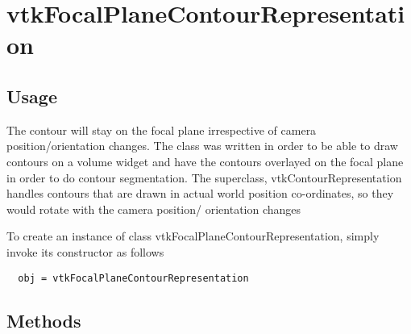 \section{vtkFocalPlaneContourRepresentation}

\subsection{Usage}

 The contour will stay on the focal plane irrespective of camera 
 position/orientation changes. The class was written in order to be able to 
 draw contours on a volume widget and have the contours overlayed on the 
 focal plane in order to do contour segmentation. The superclass, 
 vtkContourRepresentation handles contours that are drawn in actual world 
 position co-ordinates, so they would rotate with the camera position/
 orientation changes


To create an instance of class vtkFocalPlaneContourRepresentation, simply
invoke its constructor as follows
\begin{verbatim}
  obj = vtkFocalPlaneContourRepresentation
\end{verbatim}
\subsection{Methods}

